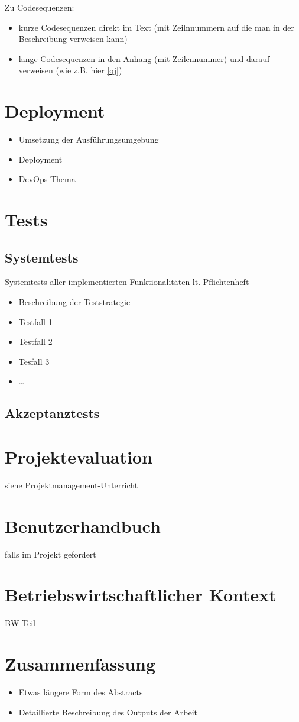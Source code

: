 Zu Codesequenzen:
\begin{itemize}
	\item kurze Codesequenzen direkt im Text (mit Zeilnnummern auf die man in der Beschreibung verweisen kann)
	\item lange Codesequenzen in den Anhang (mit Zeilennummer) und darauf verweisen (wie z.B. hier \cref{qj})
\end{itemize}

\chapter{Deployment}
\begin{itemize}
	\item Umsetzung der Ausführungsumgebung
	\item Deployment
	\item DevOps-Thema
\end{itemize}

\chapter{Tests}

\section{Systemtests} 
Systemtests aller implementierten Funktionalitäten lt. Pflichtenheft
\begin{itemize}
	\item Beschreibung der Teststrategie
	\item Testfall 1
	\item Testfall 2
	\item Tesfall 3
	\item …
\end{itemize}

\section{Akzeptanztests}

\chapter{Projektevaluation}
siehe Projektmanagement-Unterricht

\chapter{Benutzerhandbuch} 
falls im Projekt gefordert

\chapter{Betriebswirtschaftlicher Kontext}
BW-Teil

\chapter{Zusammenfassung}
\begin{itemize}
	\item Etwas längere Form des Abstracts
	\item Detaillierte Beschreibung des Outputs der Arbeit
\end{itemize}